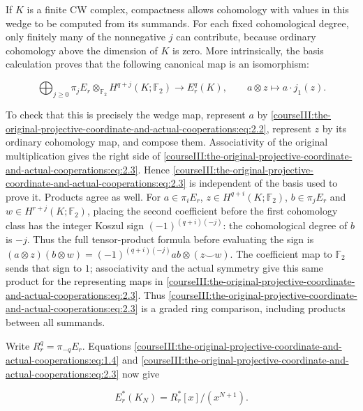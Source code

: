 If \(K\) is a finite CW complex, compactness allows cohomology with values in this wedge to be computed from its summands. For each fixed cohomological degree, only finitely many of the nonnegative \(j\) can contribute, because ordinary cohomology above the dimension of \(K\) is zero. More intrinsically, the basis calculation proves that the following canonical map is an isomorphism:

\begin{equation}
\bigoplus_{j\geq0}\pi_jE_r\otimes_{\mathbb F_2}
            H^{q+j}(K;\mathbb F_2)\longrightarrow E_r^q(K),
 \qquad a\otimes z\longmapsto a\cdot j_1(z).
 \label{courseIII:the-original-projective-coordinate-and-actual-cooperations:eq:2.3}
\end{equation}

To check that this is precisely the wedge map, represent \(a\) by \eqref{courseIII:the-original-projective-coordinate-and-actual-cooperations:eq:2.2}, represent \(z\) by its ordinary cohomology map, and compose them. Associativity of the original multiplication gives the right side of \eqref{courseIII:the-original-projective-coordinate-and-actual-cooperations:eq:2.3}. Hence \eqref{courseIII:the-original-projective-coordinate-and-actual-cooperations:eq:2.3} is independent of the basis used to prove it. Products agree as well. For \(a\in\pi_i E_r\), \(z\in H^{q+i}(K;\mathbb F_2)\), \(b\in\pi_j E_r\) and \(w\in H^{r+j}(K;\mathbb F_2)\), placing the second coefficient before the first cohomology class has the integer Koszul sign \((-1)^{(q+i)(-j)}\): the cohomological degree of \(b\) is \(-j\). Thus the full tensor-product formula before evaluating the sign is \((a\otimes z)(b\otimes w)=(-1)^{(q+i)(-j)}ab\otimes(z\smile w)\). The coefficient map to \(\mathbb F_2\) sends that sign to \(1\); associativity and the actual symmetry give this same product for the representing maps in \eqref{courseIII:the-original-projective-coordinate-and-actual-cooperations:eq:2.3}. Thus \eqref{courseIII:the-original-projective-coordinate-and-actual-cooperations:eq:2.3} is a graded ring comparison, including products between all summands.

Write \(R_r^q=\pi_{-q}E_r\). Equations \eqref{courseIII:the-original-projective-coordinate-and-actual-cooperations:eq:1.4} and \eqref{courseIII:the-original-projective-coordinate-and-actual-cooperations:eq:2.3} now give

\begin{equation}
E_r^*(K_N)=R_r^*[x]/(x^{N+1}).
 \label{courseIII:the-original-projective-coordinate-and-actual-cooperations:eq:2.4}
\end{equation}

